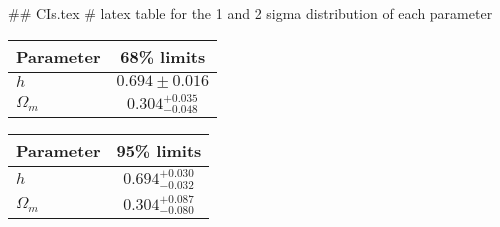 ## CIs.tex
# latex table for the 1 and 2 sigma distribution of each parameter

\begin{tabular} { l  c}
 Parameter &  68\% limits\\
\hline
{\boldmath$h              $} & $0.694\pm 0.016            $\\
{\boldmath$\Omega_m       $} & $0.304^{+0.035}_{-0.048}   $\\
\hline
\end{tabular}

\begin{tabular} { l  c}
 Parameter &  95\% limits\\
\hline
{\boldmath$h              $} & $0.694^{+0.030}_{-0.032}   $\\
{\boldmath$\Omega_m       $} & $0.304^{+0.087}_{-0.080}   $\\
\hline
\end{tabular}
